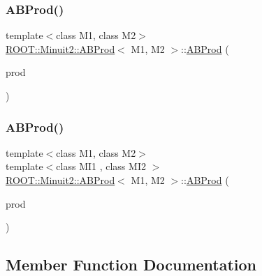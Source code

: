 \subsubsection{\texorpdfstring{ABProd()}{ABProd()}\hspace{0.1cm}{\footnotesize\ttfamily [8/9]}}
{\footnotesize\ttfamily template$<$class M1, class M2$>$ \\
\mbox{\hyperlink{classROOT_1_1Minuit2_1_1ABProd}{R\+O\+O\+T\+::\+Minuit2\+::\+A\+B\+Prod}}$<$ M1, M2 $>$\+::\mbox{\hyperlink{classROOT_1_1Minuit2_1_1ABProd}{A\+B\+Prod}} (\begin{DoxyParamCaption}\item[{const \mbox{\hyperlink{classROOT_1_1Minuit2_1_1ABProd}{A\+B\+Prod}}$<$ M1, M2 $>$ \&}]{prod }\end{DoxyParamCaption})\hspace{0.3cm}{\ttfamily [inline]}}

\mbox{\label{classROOT_1_1Minuit2_1_1ABProd_a792de1723360074762c646a30e7889f3}} 
\subsubsection{\texorpdfstring{ABProd()}{ABProd()}\hspace{0.1cm}{\footnotesize\ttfamily [9/9]}}
{\footnotesize\ttfamily template$<$class M1, class M2$>$ \\
template$<$class M\+I1 , class M\+I2 $>$ \\
\mbox{\hyperlink{classROOT_1_1Minuit2_1_1ABProd}{R\+O\+O\+T\+::\+Minuit2\+::\+A\+B\+Prod}}$<$ M1, M2 $>$\+::\mbox{\hyperlink{classROOT_1_1Minuit2_1_1ABProd}{A\+B\+Prod}} (\begin{DoxyParamCaption}\item[{const \mbox{\hyperlink{classROOT_1_1Minuit2_1_1ABProd}{A\+B\+Prod}}$<$ M\+I1, M\+I2 $>$ \&}]{prod }\end{DoxyParamCaption})\hspace{0.3cm}{\ttfamily [inline]}}



\subsection{Member Function Documentation}
\mbox{\label{classROOT_1_1Minuit2_1_1ABProd_a14f6ecd4f0a72010d6c2a8e7f2916cfa}} 
